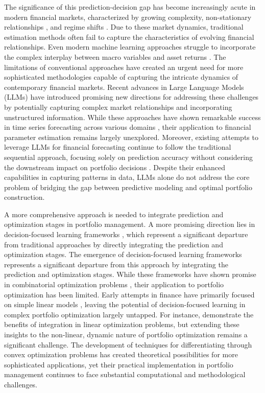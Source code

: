 The significance of this prediction-decision gap has become increasingly acute in modern financial markets, characterized by growing complexity, non-stationary relationships \citep{bekaert2002dynamics}, and regime shifts \citep{guidolin2007asset}. Due to these market dynamics, traditional estimation methods often fail to capture the characteristics of evolving financial relationships. Even modern machine learning approaches struggle to incorporate the complex interplay between macro variables and asset returns \citep{kelly2019characteristics, hwang2024temporal}. The limitations of conventional approaches have created an urgent need for more sophisticated methodologies capable of capturing the intricate dynamics of contemporary financial markets. Recent advances in Large Language Models (LLMs) have introduced promising new directions for addressing these challenges by potentially capturing complex market relationships and incorporating unstructured information. While these approaches have shown remarkable success in time series forecasting across various domains \citep{jin2023time, ansari2024chronos}, their application to financial parameter estimation remains largely unexplored. Moreover, existing attempts to leverage LLMs for financial forecasting continue to follow the traditional sequential approach, focusing solely on prediction accuracy without considering the downstream impact on portfolio decisions \citep{romanko2023chatgpt, nie2024survey}. Despite their enhanced capabilities in capturing patterns in data, LLMs alone do not address the core problem of bridging the gap between predictive modeling and optimal portfolio construction.

A more comprehensive approach is needed to integrate prediction and optimization stages in portfolio management. A more promising direction lies in decision-focused learning frameworks \citep{mandi2024decision}, which represent a significant departure from traditional approaches by directly integrating the prediction and optimization stages. The emergence of decision-focused learning frameworks represents a significant departure from this approach by integrating the prediction and optimization stages. While these frameworks have shown promise in combinatorial optimization problems \citep{amos2017optnet, cvxpylayers2019}, their application to portfolio optimization has been limited. Early attempts in finance have primarily focused on simple linear models \citep{butler2023integrating}, leaving the potential of decision-focused learning in complex portfolio optimization largely untapped. For instance, \cite{elmachtoub2022smart} demonstrate the benefits of integration in linear optimization problems, but extending these insights to the non-linear, dynamic nature of portfolio optimization remains a significant challenge. The development of techniques for differentiating through convex optimization problems \citep{amos2017optnet, cvxpylayers2019} has created theoretical possibilities for more sophisticated applications, yet their practical implementation in portfolio management continues to face substantial computational and methodological challenges.

